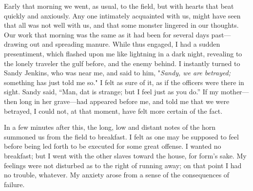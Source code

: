 Early that morning we went, as usual, to the field, but with hearts that
beat quickly and anxiously. Any one intimately acquainted with us, might
have seen that all was not well with us, and that some monster lingered
in our thoughts. Our work that morning was the same as it had been for
several days past---drawing out and spreading manure. While thus
engaged, I had a sudden presentiment, which flashed upon me like
lightning in a dark night, revealing to the lonely traveler the gulf
before, and the enemy behind. I instantly turned to Sandy Jenkins, who
was near me, and said to him, "\emph{Sandy, we are betrayed;} something
has just told me so." I felt as sure of it, as if the officers were
there in sight. Sandy said, ``Man, dat is strange; but I feel just as
you do.'' If my mother---then long in her grave---had appeared
{\protect\hypertarget{290}{}{}}before me, and told me that we were
betrayed, I could not, at that moment, have felt more certain of the
fact.

In a few minutes after this, the long, low and distant notes of the horn
summoned us from the field to breakfast. I felt as one may be supposed
to feel before being led forth to be executed for some great offense. I
wanted no breakfast; but I went with the other slaves toward the house,
for form's sake. My feelings were not disturbed as to the right of
running away; on that point I had no trouble, whatever. My anxiety arose
from a sense of the consequences of failure.

